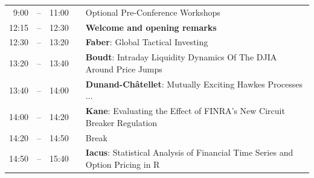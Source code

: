 \documentclass[letterpaper,10pt]{article}
\newcommand{\mylinecolor}[1]{\color{#1}\vspace{-8pt}}  %
\begin{document}
\begin{tabular}{rlrlp{5in}}
  9:00 & -- & 11:00 &   & \small{\mylinecolor{Breaks} Optional Pre-Conference Workshops} \\[5pt]
  12:15  & -- & 12:30  & & \textbf{\color{Breaks} Welcome and opening remarks} \\
  12:30 & -- & 13:20 &    & \textbf{\color{KeynoteTalk} Faber}: \small{Global Tactical Investing} \\
  13:20 & -- & 13:40 &    & \textbf{\color{Talk} Boudt}: \small{Intraday Liquidity Dynamics Of The DJIA Around Price Jumps} \\
  13:40 & -- & 14:00 &    & \textbf{\color{Talk} Dunand-Ch\^{a}tellet}: \small{Mutually Exciting Hawkes Processes $\ldots$} \\ %
  14:00 & -- & 14:20 &    & \textbf{\color{Talk} Kane}: \small{Evaluating the Effect of FINRA's New Circuit Breaker Regulation} \\
  14:20 & -- & 14:50 &    & \small{\mylinecolor{Breaks} Break} \\
  14:50 & -- & 15:40 &    & \textbf{\color{KeynoteTalk} Iacus}: \small{Statistical Analysis of Financial Time Series and Option Pricing in R} \\

\end{tabular}
\end{document}
